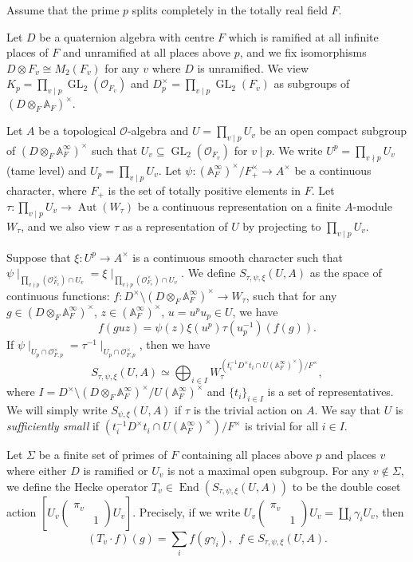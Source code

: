 \documentclass[12pt]{amsart}
\theoremstyle{plain}
\theoremstyle{definition}
\theoremstyle{remark}
\begin{document}
Assume that the prime $p$ splits completely in the totally real field $F$.

Let $D$ be a quaternion algebra with centre $F$ which is ramified at all infinite places of $F$ and unramified at all places above $p$, and we fix isomorphisms $D \otimes F_v \cong M_2(F_v)$ for any $v$ where $D$ is unramified. We view $K_p = \prod_{v \mid p} \operatorname{GL}_2(\mathcal{O}_{F_v})$ and $D_p^\times =  \prod_{v \mid p} \operatorname{GL}_2(F_v)$ as subgroups of $(D \otimes_F \mathbb{A}_F)^\times$.

Let $A$ be a topological $\mathcal{O}$-algebra and $U = \prod_{v \mid p} U_v$ be an open compact subgroup of $(D \otimes_F \mathbb{A}_F^\infty)^\times$ such that $U_v \subseteq \operatorname{GL}_2(\mathcal{O}_{F_v})$ for $v \mid p$. We write $U^p= \prod_{v \nmid p} U_v$ (tame level) and $U_p =\prod_{v \mid p} U_v$. Let $\psi: (\mathbb{A}_F^\infty)^\times/F_+^\times \to A^\times$ be a continuous character, where $F_+$ is the set of totally positive elements in $F$. Let $\tau: \prod_{v \mid p} U_v \to \operatorname{Aut}(W_\tau)$ be a continuous representation on a finite $A$-module $W_\tau$, and we also view $\tau$ as a representation of $U$ by projecting to $\prod_{v \mid p} U_v$. 

Suppose that $\xi: U^p \to A^\times$ is a continuous smooth character such that $\psi \mid_{\prod_{v \nmid p}(\mathcal{O}_{F_v}^\times) \cap U_v}= \xi \mid_{\prod_{v \nmid p}(\mathcal{O}_{F_v}^\times) \cap U_v}$. We define $S_{\tau, \psi, \xi}(U,A)$ as the space of continuous functions: $f: D^\times \setminus (D \otimes_F \mathbb{A}_F^\infty)^\times \to W_\tau$, such that for any $g \in (D \otimes_F \mathbb{A}_F^\infty)^\times$, $z \in (\mathbb{A}_F^\infty)^\times$, $u=u^pu_p \in U$, we have $$
f(guz)= \psi(z)\xi(u^p)\tau(u_p^{-1})(f(g)).$$ 
If $\psi \mid_{U_p \cap \mathcal{O}_{F, p}^\times} = \tau^{-1} \mid_{U_p \cap \mathcal{O}_{F, p}^\times}$, then we have $$
S_{\tau, \psi, \xi}(U,A) \simeq \bigoplus_{i \in I} W_\tau ^{(t_i^{-1}D^{\times}t_i \cap U (\mathbb{A}_F^\infty)^\times)/F^\times},$$
where $I=D^\times \setminus (D \otimes_F \mathbb{A}_F^\infty)^\times/ U(\mathbb{A}_F^\infty)^\times$ and $\{t_i\}_{i \in I}$ is a set of representatives. We will simply write $S_{\psi, \xi}(U,A)$ if $\tau$ is the trivial action on $A$. We say that $U$ is \textit{sufficiently small} if $ (t_i^{-1}D^{\times}t_i \cap U (\mathbb{A}_F^\infty)^\times)/F^\times$ is trivial for all $i \in I$.

Let $\Sigma$ be a finite set of primes of $F$ containing all places above $p$ and places $v$ where either $D$ is ramified or $U_v$ is not a maximal open subgroup. For any $v \notin \Sigma$, we define the Hecke operator $T_v \in \operatorname{End}(S_{\tau, \psi, \xi}(U,A))$ to be the double coset action $[U_v \begin{pmatrix}
	\pi_v & ~\\
	~ & 1
\end{pmatrix}U_v]$. Precisely, if we write $U_v \begin{pmatrix}
\pi_v & ~\\
~ & 1
\end{pmatrix}U_v  = \coprod_i \gamma_i U_v $, then $$
(T_v \cdot f) (g) = \sum_i f(g\gamma_i), ~~f \in S_{\tau, \psi, \xi}(U,A). $$
\end{document}
